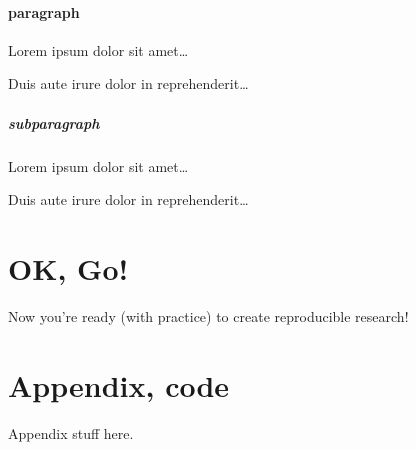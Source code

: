 \documentclass[letterpaper,12pt]{article}
\begin{document}
\paragraph{paragraph}
Lorem ipsum dolor sit amet\ldots

Duis aute irure dolor in reprehenderit\ldots

\subparagraph{subparagraph}
Lorem ipsum dolor sit amet\ldots

Duis aute irure dolor in reprehenderit\ldots

\section{OK, Go!}

Now you're ready (with practice) to create reproducible research!

\appendix     %

\section{Appendix, code}

Appendix stuff here.
\end{document}
